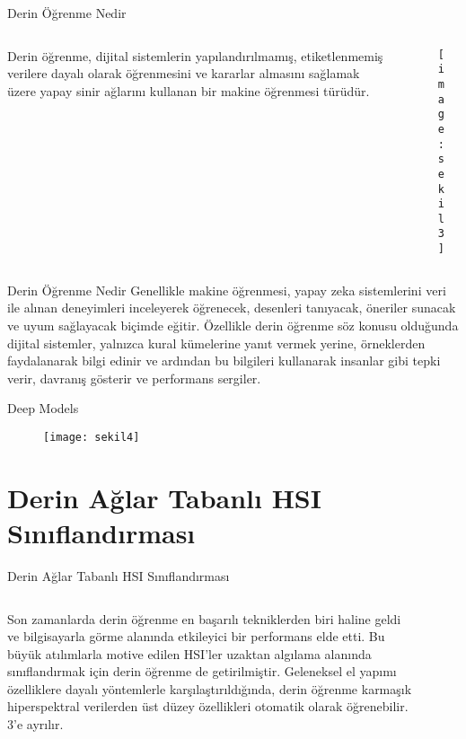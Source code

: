 \documentclass{beamer}
\begin{document}
\begin{frame}{Derin Öğrenme Nedir}
	\begin{columns}
		\begin{column}{0.5\textwidth}
Derin öğrenme, dijital sistemlerin yapılandırılmamış, etiketlenmemiş verilere dayalı olarak öğrenmesini ve kararlar almasını sağlamak üzere yapay sinir ağlarını kullanan bir makine öğrenmesi türüdür.
		\end{column}
		\begin{column}{0.5\textwidth}
			\begin{figure}
		\texttt{[image: sekil3]}
			\end{figure}
		\end{column}
	\end{columns}
\end{frame}

\begin{frame}{Derin Öğrenme Nedir}
	Genellikle makine öğrenmesi, yapay zeka sistemlerini veri ile alınan deneyimleri inceleyerek öğrenecek, desenleri tanıyacak, öneriler sunacak ve uyum sağlayacak biçimde eğitir. Özellikle derin öğrenme söz konusu olduğunda dijital sistemler, yalnızca kural kümelerine yanıt vermek yerine, örneklerden faydalanarak bilgi edinir ve ardından bu bilgileri kullanarak insanlar gibi tepki verir, davranış gösterir ve performans sergiler.
\end{frame}

\begin{frame}{Deep Models }
	\begin{figure}
		\centering
		\texttt{[image: sekil4]}
	\end{figure}
\end{frame}

\section{Derin Ağlar Tabanlı HSI Sınıflandırması}
\begin{frame}{Derin Ağlar Tabanlı HSI Sınıflandırması}
\begin{columns} 
	\begin{column}[]{0.5\textwidth}
Son zamanlarda derin öğrenme en başarılı tekniklerden biri haline geldi ve bilgisayarla görme alanında etkileyici bir performans elde etti. Bu büyük atılımlarla motive edilen HSI’ler uzaktan algılama alanında sınıflandırmak için derin öğrenme de getirilmiştir. Geleneksel el yapımı özelliklere dayalı yöntemlerle karşılaştırıldığında, derin öğrenme karmaşık hiperspektral verilerden üst düzey özellikleri otomatik olarak öğrenebilir. 3’e ayrılır.
	\end{column}
	\begin{column}[]{0.5\textwidth}
		\begin{figure}[]
			\texttt{[image: sekil5]}
		\end{figure}
	\end{column}
\end{columns}
\end{frame}
\end{document}

